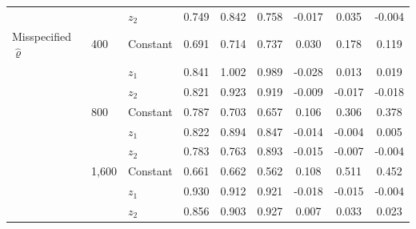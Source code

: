 \begin{tabular}{lllcccccc}
 &  & $z_2$ & 0.749 & 0.842 & 0.758 & -0.017 & 0.035 & -0.004 \\
\addlinespace
Misspecified $\hat\varrho$ & 400 & Constant & 0.691 & 0.714 & 0.737 & 0.030 & 0.178 & 0.119 \\
 &  & $z_1$ & 0.841 & 1.002 & 0.989 & -0.028 & 0.013 & 0.019 \\
 &  & $z_2$ & 0.821 & 0.923 & 0.919 & -0.009 & -0.017 & -0.018 \\
 & 800 & Constant & 0.787 & 0.703 & 0.657 & 0.106 & 0.306 & 0.378 \\
 &  & $z_1$ & 0.822 & 0.894 & 0.847 & -0.014 & -0.004 & 0.005 \\
 &  & $z_2$ & 0.783 & 0.763 & 0.893 & -0.015 & -0.007 & -0.004 \\
 & 1,600 & Constant & 0.661 & 0.662 & 0.562 & 0.108 & 0.511 & 0.452 \\
 &  & $z_1$ & 0.930 & 0.912 & 0.921 & -0.018 & -0.015 & -0.004 \\
 &  & $z_2$ & 0.856 & 0.903 & 0.927 & 0.007 & 0.033 & 0.023 \\
\bottomrule
\end{tabular}
